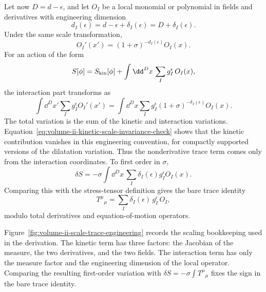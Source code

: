 Let now \(D=d-\epsilon\), and let \(O_I\) be a local monomial or polynomial in
fields and derivatives with engineering dimension
\[
  d_I(\epsilon)=d-\epsilon+\delta_I(\epsilon)=D+\delta_I(\epsilon).
\]
Under the same scale transformation,
\[
  O_I'(x')
  =
  (1+\sigma)^{-d_I(\epsilon)}O_I(x).
\]
For an action of the form
\[
  S[\phi]
  =
  S_{\rm kin}[\phi]
  +
  \int\dd^D x\,\sum_I g_I^\epsilon\,O_I(x),
\]
the interaction part transforms as
\[
  \int\dd^D x'\sum_I g_I^\epsilon O_I'(x')
  =
  \int\dd^D x\sum_I
  g_I^\epsilon(1+\sigma)^{-\delta_I(\epsilon)}O_I(x).
\]
The total variation is the sum of the kinetic and interaction variations.
Equation~\eqref{eq:volume-ii-kinetic-scale-invariance-check} shows that the
kinetic contribution vanishes in this engineering convention, for compactly
supported versions of the dilatation variation.  Thus the nonderivative trace
term comes only from the interaction coordinates.
To first order in \(\sigma\),
\[
  \delta S
  =
  -\sigma\int\dd^D x\,
  \sum_I\delta_I(\epsilon)g_I^\epsilon O_I(x).
\]
Comparing this with the stress-tensor definition gives the bare trace identity
\[
  T^\mu{}_\mu
  =
  \sum_I\delta_I(\epsilon)\,g_I^\epsilon\,O_I,
\]
modulo total derivatives and equation-of-motion operators.

Figure~\ref{fig:volume-ii-scale-trace-engineering} records the scaling
bookkeeping used in the derivation.  The kinetic term has three factors: the
Jacobian of the measure, the two derivatives, and the two fields.  The
interaction term has only the measure factor and the engineering dimension of
the local operator.  Comparing the resulting first-order variation with
\(\delta S=-\sigma\int T^\mu{}_\mu\) fixes the sign in the bare trace identity.

